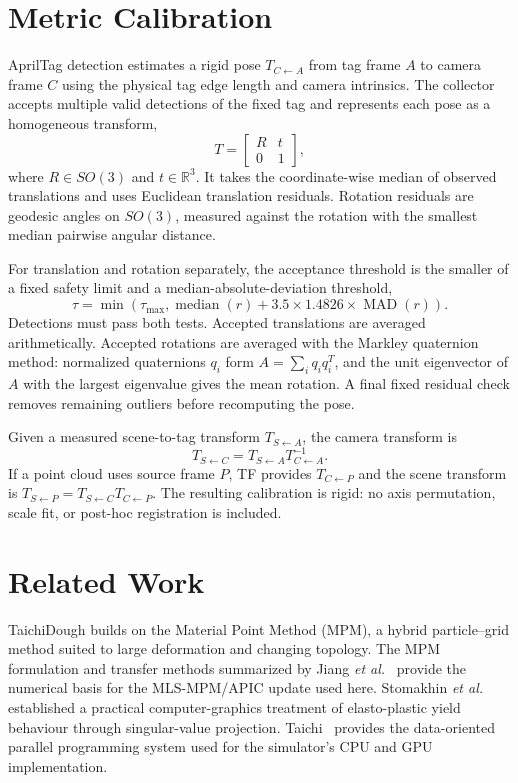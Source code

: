 \documentclass[conference]{IEEEtran}
\begin{document}
\section{Metric Calibration}
AprilTag detection estimates a rigid pose $T_{C\leftarrow A}$ from tag frame $A$ to camera frame $C$ using the physical tag edge length and camera intrinsics. The collector accepts multiple valid detections of the fixed tag and represents each pose as a homogeneous transform,
\begin{equation}
T=\begin{bmatrix}R&t\\0&1\end{bmatrix},
\end{equation}
where $R\in SO(3)$ and $t\in\mathbb{R}^3$. It takes the coordinate-wise median of observed translations and uses Euclidean translation residuals. Rotation residuals are geodesic angles on $SO(3)$, measured against the rotation with the smallest median pairwise angular distance.

For translation and rotation separately, the acceptance threshold is the smaller of a fixed safety limit and a median-absolute-deviation threshold,
\begin{equation}
\tau=\min\left(\tau_{\max},\operatorname{median}(r)+3.5\times1.4826\times\operatorname{MAD}(r)\right).
\end{equation}
Detections must pass both tests. Accepted translations are averaged arithmetically. Accepted rotations are averaged with the Markley quaternion method: normalized quaternions $q_i$ form $A=\sum_iq_iq_i^T$, and the unit eigenvector of $A$ with the largest eigenvalue gives the mean rotation. A final fixed residual check removes remaining outliers before recomputing the pose.

Given a measured scene-to-tag transform $T_{S\leftarrow A}$, the camera transform is
\begin{equation}
T_{S\leftarrow C}=T_{S\leftarrow A}T_{C\leftarrow A}^{-1}.
\end{equation}
If a point cloud uses source frame $P$, TF provides $T_{C\leftarrow P}$ and the scene transform is $T_{S\leftarrow P}=T_{S\leftarrow C}T_{C\leftarrow P}$. The resulting calibration is rigid: no axis permutation, scale fit, or post-hoc registration is included.

\section{Related Work}
TaichiDough builds on the Material Point Method (MPM), a hybrid particle--grid method suited to large deformation and changing topology. The MPM formulation and transfer methods summarized by Jiang \emph{et al.}~\cite{jiang2016mpm} provide the numerical basis for the MLS-MPM/APIC update used here. Stomakhin \emph{et al.}~\cite{stomakhin2013snow} established a practical computer-graphics treatment of elasto-plastic yield behaviour through singular-value projection. Taichi~\cite{hu2019taichi} provides the data-oriented parallel programming system used for the simulator's CPU and GPU implementation.
\end{document}
